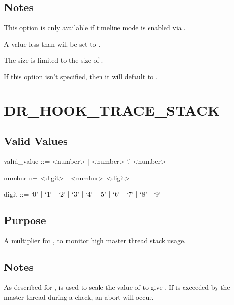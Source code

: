 \documentclass[letterpaper,10pt,english]{sphinxmanual}
\begin{document}
\subsection{Notes}
\label{\detokenize{flag/flag:id121}}
\sphinxAtStartPar
This option is only available if timeline mode is enabled via {\hyperref[\detokenize{flag/flag:dr-hook-timeline}]{}}.

\sphinxAtStartPar
A value less than  will be set to .

\sphinxAtStartPar
The size is limited to the size of .

\sphinxAtStartPar
If this option isn’t specified, then it will default to .


\section{DR\_HOOK\_TRACE\_STACK}
\label{\detokenize{flag/flag:dr-hook-trace-stack}}\label{\detokenize{flag/flag:id123}}

\subsection{Valid Values}
\label{\detokenize{flag/flag:id124}}
\begin{DUlineblock}{0em}
\item[] valid\_value ::= \textless{}number\textgreater{} | \textless{}number\textgreater{} ‘.’ \textless{}number\textgreater{}
\item[] number ::= \textless{}digit\textgreater{} | \textless{}number\textgreater{} \textless{}digit\textgreater{}
\item[] digit ::= ‘0’ | ‘1’ | ‘2’ | ‘3’ | ‘4’ | ‘5’ | ‘6’ | ‘7’ | ‘8’ | ‘9’
\end{DUlineblock}


\subsection{Purpose}
\label{\detokenize{flag/flag:id125}}
\sphinxAtStartPar
A multiplier for {\hyperref[\detokenize{flag/flag:omp-stacksize}]{}}, to monitor high master thread stack usage.


\subsection{Notes}
\label{\detokenize{flag/flag:id126}}
\sphinxAtStartPar
As described for {\hyperref[\detokenize{flag/flag:omp-stacksize}]{}},  is used to scale the value of {\hyperref[\detokenize{flag/flag:omp-stacksize}]{}} to give . If  is exceeded by the master thread during a  check, an abort will occur.
\end{document}
